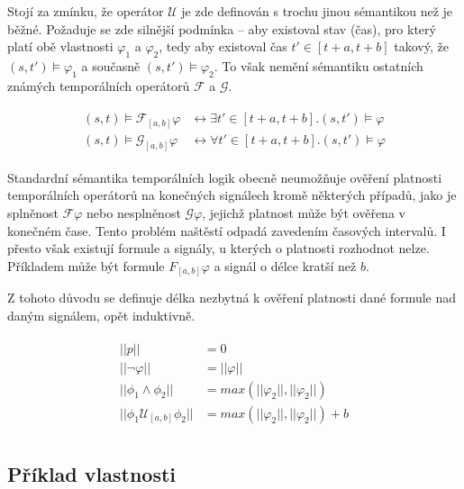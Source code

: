 Stojí za zmínku, že operátor $\mathcal{U}$ je zde definován s trochu jinou sé\-man\-ti\-kou
než je běžné. Požaduje se zde silnější podmínka -- aby existoval stav (čas),
pro který platí obě vlastnosti $\varphi_1$ a $\varphi_2$, tedy aby existoval
čas $t' \in [t + a, t + b]$ takový, že $(s, t') \models \varphi_1$
a současně $(s, t') \models \varphi_2$. To však nemění sémantiku ostatních známých
temporálních operátorů $\mathcal{F}$ a $\mathcal{G}$.

\begin{align}\label{eq:stl:semantics}
\begin{array}{ll}
(s, t) \models \mathcal{F}_{[a,b]}\varphi &\longleftrightarrow	\exists t'\in[t+a, t+b].(s,t') \models \varphi		\\
(s, t) \models \mathcal{G}_{[a,b]}\varphi &\longleftrightarrow	\forall t'\in[t+a, t+b].(s,t') \models \varphi
\end{array}
\end{align}

Standardní sémantika temporálních logik obecně neumožňuje ověření platnosti temporálních operátorů
na konečných signálech kromě některých případů, jako je splněnost $\mathcal{F}\varphi$
nebo nesplněnost $\mathcal{G}\varphi$, jejichž platnost může být ověřena v konečném čase.
Tento problém naštěstí odpadá zavedením časových intervalů. I přesto však existují
formule a signály, u kterých o platnosti rozhodnot nelze. Příkladem může být formule $F_{[a, b]}\varphi$
a signál o délce kratší než $b$.

Z tohoto důvodu se definuje délka nezbytná k ověření platnosti dané formule nad daným signálem,
opět induktivně.

\begin{align}\label{eq:stl:min:length}
\begin{array}{ll}
||p||									&= 0									\\
||\neg\varphi||							&= ||\varphi||							\\
||\phi_1 \wedge \phi_2||				&= max(||\varphi_2||,||\varphi_2||) 	\\
||\phi_1 \mathcal{U}_{[a,b]} \phi_2||	&= max(||\varphi_2||,||\varphi_2||) + b	\\
\end{array}
\end{align}

\subsection{Příklad vlastnosti}\label{section:stl:example}

